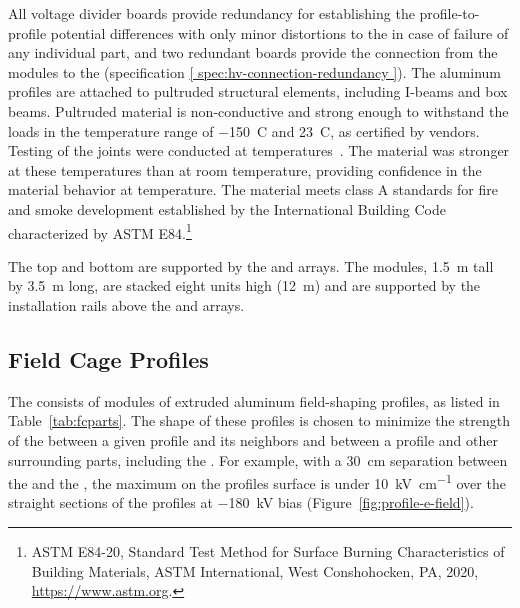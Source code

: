 All voltage divider boards provide redundancy for establishing the profile-to-profile potential differences with only minor distortions to the \efield in case of failure of any individual part, and two redundant boards provide the connection from the  modules to the  
(specification \ref{ spec:hv-connection-redundancy }).  
The aluminum profiles are attached to  pultruded structural elements, including I-beams and box beams.  
Pultruded  material is non-conductive and strong enough to withstand the  loads  in the temperature range of \SI{-150}{C} and \SI{23}{C}, as certified by vendors. Testing of the  joints were conducted at  temperatures~\cite{bib:docdb1504}. 
The material was stronger at these temperatures than at room temperature, 
providing confidence in the material behavior at   temperature. The  material meets class A standards for fire and smoke development established by the International Building Code characterized by ASTM E84.\footnote{ASTM E84-20, Standard Test Method for Surface Burning Characteristics of Building Materials, ASTM International, West Conshohocken, PA, 2020, \url{https://www.astm.org}.}

The top and bottom  %
are supported by the  and  arrays. The  modules, 
\SI{1.5}{\m} tall by \SI{3.5}{\m} long, are stacked eight units high (\SI{12}{\m}) and are supported by the installation rails above the  and  arrays.



\subsection{Field Cage Profiles}
\label{sec:fdsp-hv-des-fc-profiles}

The  consists of modules of extruded aluminum  field-shaping  %
profiles, as listed in Table~\ref{tab:fcparts}. The shape of these %
profiles is chosen to minimize the strength of the \efield{} between a given profile and its neighbors and between a profile and
other surrounding parts, including the . For example, with a \SI{30}{\cm} separation between the  and the , the maximum \efield{} on the profiles surface is under \SI{10}{\kilo\volt\per\centi\meter} over the straight sections of the profiles at \SI{-180}{\kV} bias (Figure~\ref{fig:profile-e-field}).  


